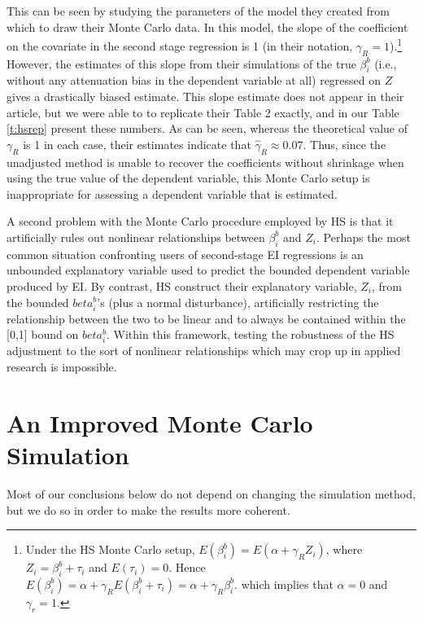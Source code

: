 \documentclass[11pt,titlepage]{article}
\begin{document}
This can be seen by studying the parameters of the model they created
from which to draw their Monte Carlo data.  In this model, the slope
of the coefficient on the covariate in the second stage regression is
1 (in their notation, $\gamma_R=1$).\footnote{Under the HS Monte Carlo
  setup, $E(\beta_i^b)=E(\alpha+\gamma_R Z_i)$, where
  $Z_i=\beta_i^b+\tau_i$ and $E(\tau_i)=0$.  Hence
  $E(\beta_i^b)=\alpha+\gamma_RE(\beta_i^b+\tau_i)=\alpha+\gamma_R\beta_i^b$.
  which implies that $\alpha=0$ and $\gamma_r=1$.}  However, the
estimates of this slope from their simulations of the true $\beta_i^b$
(i.e., without any attenuation bias in the dependent variable at all)
regressed on $Z$ gives a drastically biased estimate.  This slope
estimate does not appear in their article, but we were able to to
replicate their Table 2 exactly, and in our Table \ref{t:hsrep}
present these numbers.  As can be seen, whereas the theoretical value
of $\gamma_R$ is 1 in each case, their estimates indicate that
$\hat\gamma_R\approx 0.07$.  Thus, since the unadjusted method is
unable to recover the coefficients without shrinkage when using the
true value of the dependent variable, this Monte Carlo setup is
inappropriate for assessing a dependent variable that is estimated.

A second problem with the Monte Carlo procedure employed by HS is that
it artificially rules out nonlinear relationships between $\beta_i^b$
and $Z_i$.  Perhaps the most common situation confronting users of
second-stage EI regressions is an unbounded explanatory variable used
to predict the bounded dependent variable produced by EI.  By
contrast, HS construct their explanatory variable, $Z_i$, from the
bounded $beta_i^b$'s (plus a normal disturbance), artificially
restricting the relationship between the two to be linear and to
always be contained within the [0,1] bound on $beta_i^b$.  Within this
framework, testing the robustness of the HS adjustment to the sort of
nonlinear relationships which may crop up in applied research is
impossible.

\section{An Improved Monte Carlo Simulation} \label{s:alt}

Most of our conclusions below do not depend on changing the simulation
method, but we do so in order to make the results more coherent.
\end{document}
